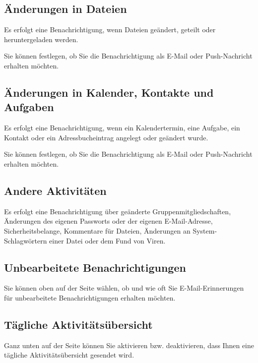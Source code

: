 \documentclass[
  letterpaper,
  DIV=11,
  numbers=noendperiod]{scrreprt}
\begin{document}
\subsection{Änderungen in Dateien}\label{uxe4nderungen-in-dateien}

Es erfolgt eine Benachrichtigung, wenn Dateien geändert, geteilt oder
heruntergeladen werden.

Sie können festlegen, ob Sie die Benachrichtigung als E-Mail oder
Push-Nachricht erhalten möchten.

\subsection{Änderungen in Kalender, Kontakte und
Aufgaben}\label{uxe4nderungen-in-kalender-kontakte-und-aufgaben}

Es erfolgt eine Benachrichtigung, wenn ein Kalendertermin, eine Aufgabe,
ein Kontakt oder ein Adressbucheintrag angelegt oder geändert wurde.

Sie können festlegen, ob Sie die Benachrichtigung als E-Mail oder
Push-Nachricht erhalten möchten.

\subsection{Andere Aktivitäten}\label{andere-aktivituxe4ten}

Es erfolgt eine Benachrichtigung über geänderte Gruppenmitgliedschaften,
Änderungen des eigenen Passworts oder der eigenen E-Mail-Adresse,
Sicherheitsbelange, Kommentare für Dateien, Änderungen an
System-Schlagwörtern einer Datei oder dem Fund von Viren.

\subsection{Unbearbeitete
Benachrichtigungen}\label{unbearbeitete-benachrichtigungen}

Sie können oben auf der Seite wählen, ob und wie oft Sie
E-Mail-Erinnerungen für unbearbeitete Benachrichtigungen erhalten
möchten.

\subsection{Tägliche
Aktivitätsübersicht}\label{tuxe4gliche-aktivituxe4tsuxfcbersicht}

Ganz unten auf der Seite können Sie aktivieren bzw. deaktivieren, dass
Ihnen eine tägliche Aktivitätsübersicht gesendet wird.
\end{document}
